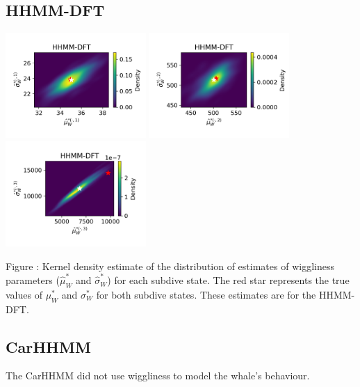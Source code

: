 \documentclass{article}
\begin{document}
        \subsection{HHMM-DFT}
        \begin{center}
        \includegraphics[width=2.1in]{../Plots/hhmm_FV_uncorr_MLE_density_FoVeDBA_0_0.png}
        \includegraphics[width=2.1in]{../Plots/hhmm_FV_uncorr_MLE_density_FoVeDBA_0_1.png}
        \includegraphics[width=2.1in]{../Plots/hhmm_FV_uncorr_MLE_density_FoVeDBA_0_2.png}
        \end{center}
        
        \noindent Figure : Kernel density estimate of the distribution of estimates of wiggliness parameters ($\hat \mu^*_W$ and $\hat \sigma^*_W$) for each subdive state. The red star represents the true values of $\mu^*_W$ and $\sigma^*_W$ for both subdive states. These estimates are for the HHMM-DFT.
        \addtocounter{fignum}{1}
        
        \subsection{CarHHMM}
        The CarHHMM did not use wiggliness to model the whale's behaviour.
        
\end{document}
